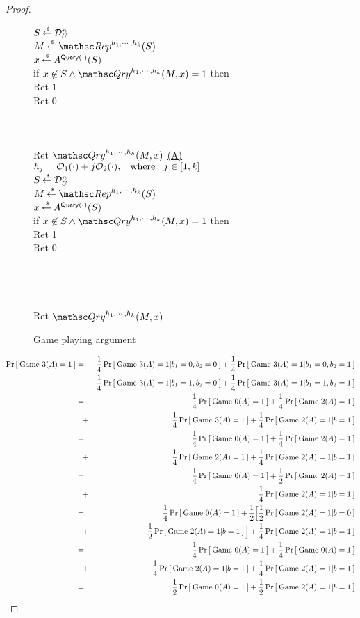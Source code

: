 \begin{proof}
\begin{figure}[h]
{{$S {\:\stackrel{{\scriptscriptstyle \hspace{0.2em}\$}} {\leftarrow}\:} \mathcal{D}_{U}^{n}$\\
$M \getsr \Rep^{h_1, \cdots, h_k}(S)$\\
$x {\:\stackrel{{\scriptscriptstyle \hspace{0.2em}\$}} {\leftarrow}\:} A^{\mathsf{Query}(\cdot)}(S)$\\
if $x \not\in S \wedge \Qry^{h_1, \cdots, h_k}(M,x)=1$ then\\
\nudge Ret 1\\
Ret 0\\\\\\
%
\\
Ret $\Qry^{h_1, \cdots, h_k}(M,x)$
}
{
\underline{(A)}\\
$h_j = {\cal O}_1(\cdot) + j{\cal O}_2(\cdot), \hspace*{2ex} \mathrm{where} \hspace*{2ex} j \in [1,k]$\\
$S {\:\stackrel{{\scriptscriptstyle \hspace{0.2em}\$}} {\leftarrow}\:} \mathcal{D}_{U}^{n}$\\
$M \getsr \Rep^{h_1, \cdots, h_k}(S)$\\
$x {\:\stackrel{{\scriptscriptstyle \hspace{0.2em}\$}} {\leftarrow}\:} A^{\mathsf{Query}(\cdot)}(S)$\\
if $x \not\in S \wedge \Qry^{h_1, \cdots, h_k}(M,x)=1$ then\\
\nudge Ret 1\\
Ret 0\\\\\\\\
%
\\
Ret $\Qry^{h_1, \cdots, h_k}(M,x)$
}
}
\caption{Game playing argument}\label{fig:Game}
\end{figure}

\begin{eqnarray*}
\Pr\left[\: \text{Game 3}(A)=1 \:\right] &=&\frac{1}{4}\Pr\left[\: \text{Game 3}(A)=1|b_1=0, b_2=0 \:\right] + \frac{1}{4}\Pr\left[\: \text{Game 3}(A)=1|b_1=0, b_2=1 \:\right]\\
& + & \frac{1}{4}\Pr\left[\: \text{Game 3}(A)=1|b_1=1, b_2=0 \:\right]+ \frac{1}{4}\Pr\left[\: \text{Game 3}(A)=1|b_1=1, b_2=1 \:\right]\\
& = & \frac{1}{4}\Pr\left[\: \text{Game 0}(A)=1 \:\right] + \frac{1}{4}\Pr\left[\: \text{Game 2}(A)=1 \:\right]\\
&\hspace*{2ex} + & \frac{1}{4}\Pr\left[\: \text{Game 3}(A)=1 \:\right] + \frac{1}{4}\Pr\left[\: \text{Game 2}(A)=1|b=1 \:\right]\\
& = & \frac{1}{4}\Pr\left[\: \text{Game 0}(A)=1 \:\right] + \frac{1}{4}\Pr\left[\: \text{Game 2}(A)=1 \:\right]\\
&\hspace*{2ex} + & \frac{1}{4}\Pr\left[\: \text{Game 2}(A)=1 \:\right] + \frac{1}{4}\Pr\left[\: \text{Game 2}(A)=1|b=1 \:\right]\\
& = & \frac{1}{4}\Pr\left[\: \text{Game 0}(A)=1 \:\right] + \frac{1}{2}\Pr\left[\: \text{Game 2}(A)=1 \:\right]\\
&\hspace*{2ex} + & \frac{1}{4}\Pr\left[\: \text{Game 2}(A)=1|b=1 \:\right]\\
& = & \frac{1}{4}\Pr\left[\: \text{Game 0}(A)=1 \:\right] + \frac{1}{2}\Big[\frac{1}{2}\Pr\left[\: \text{Game 2}(A)=1|b=0 \:\right]\\
	& \hspace*{2ex} + & \frac{1}{2}\Pr\left[\: \text{Game 2}(A)=1|b=1 \:\right]\Big] + \frac{1}{4}\Pr\left[\: \text{Game 2}(A)=1|b=1 \:\right]\\
& = & \frac{1}{4}\Pr\left[\: \text{Game 0}(A)=1 \:\right] + \frac{1}{4}\Pr\left[\: \text{Game 0}(A)=1 \:\right]\\
& \hspace*{2ex} + & \frac{1}{4}\Pr\left[\: \text{Game 2}(A)=1|b=1 \:\right] + \frac{1}{4}\Pr\left[\: \text{Game 2}(A)=1|b=1 \:\right]\\
& = & \frac{1}{2}\Pr\left[\: \text{Game 0}(A)=1 \:\right] + \frac{1}{2}\Pr\left[\: \text{Game 2}(A)=1|b=1 \:\right]
\end{eqnarray*}
 

\end{proof}
